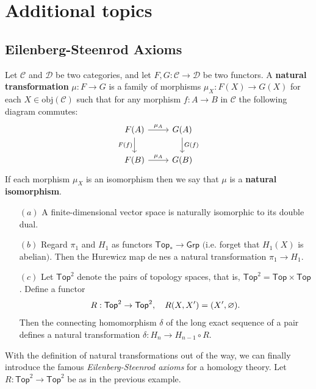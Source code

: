 \section{Additional topics}
\subsection{Eilenberg-Steenrod Axioms}
\begin{definition}
Let $\mathcal{C}$ and $\mathcal{D}$ be two categories, and let $F,G:\mathcal{C}\to\mathcal{D}$ be two functors. A \textbf{natural transformation} $\mu:F\to G$ is a family of morphisms $\mu_X:F(X)\to G(X)$ for each $X\in\mathrm{obj}(\mathcal{C})$ such that for any morphism $f:A\to B$ in $\mathcal{C}$ the following diagram commutes:
\[\begin{tikzcd}
F(A)\ar[d,swap,"F(f)"]\ar[r,"\mu_A"]&G(A)\ar[d,"G(f)"]\\
F(B)\ar[r,"\mu_A"]&G(B)
\end{tikzcd}\]
If each morphism $\mu_X$ is an isomorphism then we say that $\mu$ is a \textbf{natural isomorphism}.
\end{definition}
\begin{example}
\mbox{}
\begin{itemize}
\item[$(a)$]A finite-dimensional vector space is naturally isomorphic to its double dual.
\item[$(b)$]Regard $\pi_1$ and $H_1$ as functors $\mathsf{Top}_*\to\mathsf{Grp}$ $($i.e. forget that $H_1(X)$ is abelian$)$. Then the Hurewicz map denes a natural transformation $\pi_1\to H_1$.
\item[$(c)$]Let $\mathsf{Top}^2$ denote the pairs of topology spaces, that is, $\mathsf{Top}^2=\mathsf{Top}\times\mathsf{Top}$. Define a functor \[R:\mathsf{Top}^2\to\mathsf{Top}^2,\quad R(X,X')=(X',\varnothing).\]
Then the connecting homomorphism $\delta$ of the long exact sequence of a pair defines a natural transformation $\delta:H_n\to H_{n-1}\circ R$.
\end{itemize}
\end{example}
With the definition of natural transformations out of the way, we can finally introduce the famous \textit{Eilenberg-Steenrod axioms} for a homology theory. Let $R:\mathsf{Top}^2\to\mathsf{Top}^2$ be as in the previous example.
